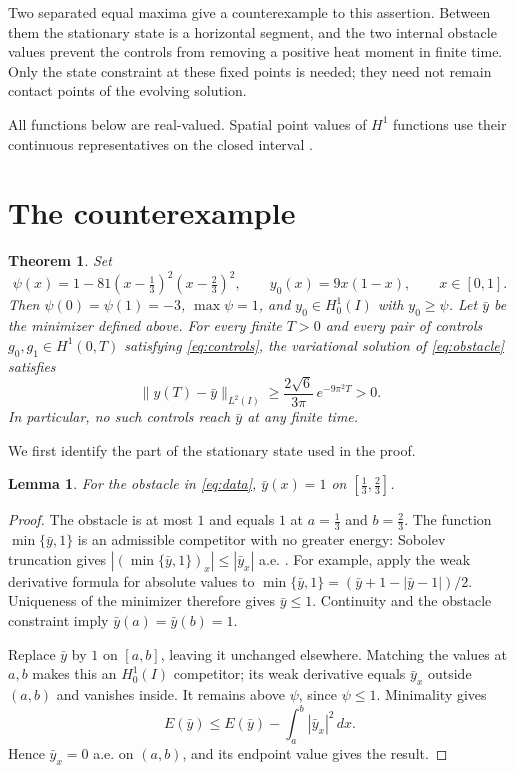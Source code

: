 \documentclass[11pt]{article}
\newtheorem{theorem}{Theorem}
\newtheorem{lemma}{Lemma}
\begin{document}
Two separated equal maxima give a counterexample to this assertion.
Between them the stationary state is a horizontal segment, and the two
internal obstacle values prevent the controls from removing a positive heat
moment in finite time. Only the state constraint at these fixed points is
needed; they need not remain contact points of the evolving solution.

All functions below are real-valued. Spatial point values of $H^1$ functions
use their continuous representatives on the closed interval
\cite[Propositions 1.8.2, 1.8.5 and 1.8.7]{gerard}.

\section{The counterexample}

\begin{theorem}\label{thm:counterexample}
Set
\begin{equation}\label{eq:data}
 \psi(x)=1-81\left(x-\tfrac13\right)^2\left(x-\tfrac23\right)^2,
 \qquad y_0(x)=9x(1-x),\qquad x\in[0,1].
\end{equation}
Then $\psi(0)=\psi(1)=-3$, $\max\psi=1$, and
$y_0\in H^1_0(I)$ with $y_0\ge\psi$.
Let $\bar y$ be the minimizer defined above. For every finite $T>0$ and every
pair of controls $g_0,g_1\in H^1(0,T)$ satisfying \eqref{eq:controls},
the variational solution of \eqref{eq:obstacle} satisfies
\begin{equation}\label{eq:error}
 \|y(T)-\bar y\|_{L^2(I)}
 \ge \frac{2\sqrt6}{3\pi}\,e^{-9\pi^2T}>0.
\end{equation}
In particular, no such controls reach $\bar y$ at any finite time.
\end{theorem}

We first identify the part of the stationary state used in the proof.
\begin{lemma}\label{lem:plateau}
For the obstacle in \eqref{eq:data}, $\bar y(x)=1$ on
$[\tfrac13,\tfrac23]$.
\end{lemma}
\begin{proof}
The obstacle is at most $1$ and equals $1$ at $a=\tfrac13$ and $b=\tfrac23$.
The function $\min\{\bar y,1\}$ is an admissible competitor with no greater
energy: Sobolev truncation gives
$|(\min\{\bar y,1\})_x|\le|\bar y_x|$ a.e.
\cite[Proposition 3.22]{hunter}. For example, apply the weak derivative
formula for absolute values to
$\min\{\bar y,1\}=(\bar y+1-|\bar y-1|)/2$.
Uniqueness of the minimizer therefore gives $\bar y\le1$.
Continuity and the obstacle constraint imply $\bar y(a)=\bar y(b)=1$.

Replace $\bar y$ by $1$ on $[a,b]$, leaving it unchanged elsewhere.
Matching the values at $a,b$ makes this an $H^1_0(I)$ competitor; its weak
derivative equals $\bar y_x$ outside $(a,b)$ and vanishes inside.
It remains above $\psi$, since $\psi\le1$. Minimality gives
\[
 E(\bar y)\le E(\bar y)-\int_a^b|\bar y_x|^2\,dx.
\]
Hence $\bar y_x=0$ a.e. on $(a,b)$, and its endpoint value gives the result.
\end{proof}
\end{document}
